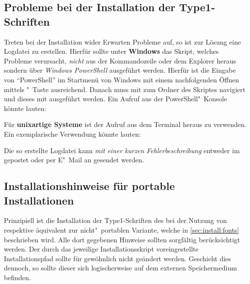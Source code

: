 \subsection{Probleme bei der Installation der Type1-Schriften}

Treten bei der Installation wider Erwarten Probleme auf, so ist zur Lösung eine 
Logdatei zu erstellen. Hierfür sollte unter \textbf{Windows} das Skript, 
welches Probleme verursacht, \emph{nicht} aus der Kommandozeile oder dem 
Explorer heraus sondern über \emph{Windows PowerShell} ausgeführt werden. 
Hierfür ist die Eingabe von \enquote{PowerShell} im Startmenü von Windows mit 
einem nachfolgenden Öffnen mittels "~Taste ausreichend. 
Danach muss mit  zum Ordner des Skriptes navigiert und dieses mit 
ausgeführt werden. Ein Aufruf aus der PowerShell"~Konsole könnte lauten:
%
\begin{quoting}[rightmargin=0pt]
  \newline%
\end{quoting}
%
Für \textbf{unixartige Systeme} ist der Aufruf 
 aus dem Terminal heraus zu 
verwenden. Ein exemplarische Verwendung könnte lauten:
%
\begin{quoting}
  \newline
\end{quoting}
%
Die so erstellte Logdatei kann \emph{mit einer kurzen Fehlerbeschreibung} 
entweder im \Forum* gepostet oder per E"~Mail an \mailto{\TUDScriptContact}
gesendet werden.%


\subsection{Installationshinweise für portable Installationen}
%
%
Prinzipiell ist die Installation der Type1-Schriften des \CDs bei der Nutzung 
von  respektive 
 äquivalent zur nicht"~portablen 
Variante, welche in \autoref{sec:install:fonts} beschrieben wird. Alle dort 
gegebenen Hinweise sollten sorgfältig berücksichtigt werden. Der durch das 
jeweilige Installationsskript voreingestellte Installationspfad sollte für 
gewöhnlich nicht geändert werden. Geschieht dies dennoch, so sollte dieser sich 
logischerweise auf dem externen Speichermedium   
 befinden.

